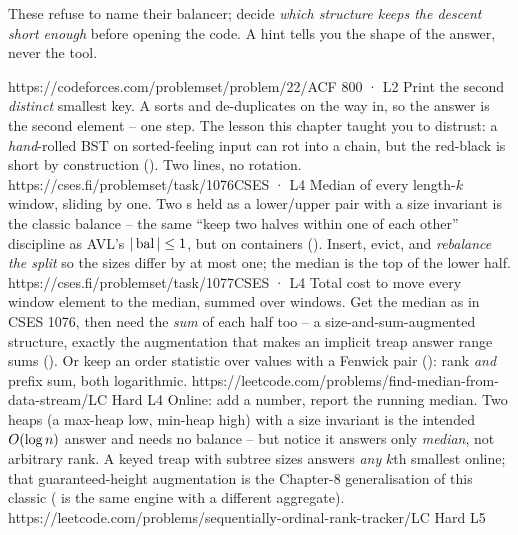 These refuse to name their balancer; decide \emph{which structure keeps the descent short enough} before
opening the code. A hint tells you the shape of the answer, never the tool.

\begin{mixedset}
    {https://codeforces.com/problemset/problem/22/A}{CF 800 · L2}
    {Print the second \emph{distinct} smallest key. A  sorts and de-duplicates on the way
    in, so the answer is the second element -- one  step. The lesson this chapter taught you
    to distrust: a \emph{hand}-rolled BST on sorted-feeling input can rot into a chain, but the red-black
     is short by construction (). Two lines, no rotation.}
    {https://cses.fi/problemset/task/1076}{CSES · L4}
    {Median of every length-$k$ window, sliding by one. Two s held as a lower/upper pair
    with a size invariant is the classic balance -- the same ``keep two halves within one of each other''
    discipline as AVL's $|\operatorname{bal}|\le1$, but on containers (). Insert, evict, and \emph{rebalance
    the split} so the sizes differ by at most one; the median is the top of the lower half.}
    {https://cses.fi/problemset/task/1077}{CSES · L4}
    {Total cost to move every window element to the median, summed over windows. Get the median as in
    CSES 1076, then need the \emph{sum} of each half too -- a size-and-sum-augmented structure, exactly the
    augmentation that makes an implicit treap answer range sums (). Or keep an order
    statistic over values with a Fenwick pair (): rank \emph{and} prefix sum, both logarithmic.}
    {https://leetcode.com/problems/find-median-from-data-stream/}{LC Hard L4}
    {Online: add a number, report the running median. Two heaps (a max-heap low, min-heap high) with a
    size invariant is the intended $O(\log n)$ answer and needs no balance -- but notice it answers only
    \emph{median}, not arbitrary rank. A keyed treap with subtree sizes answers \emph{any} $k$th smallest
    online; that guaranteed-height augmentation is the Chapter-8 generalisation of this classic
    ( is the same engine with a different aggregate).}
    {https://leetcode.com/problems/sequentially-ordinal-rank-tracker/}{LC Hard L5}

\end{mixedset}
